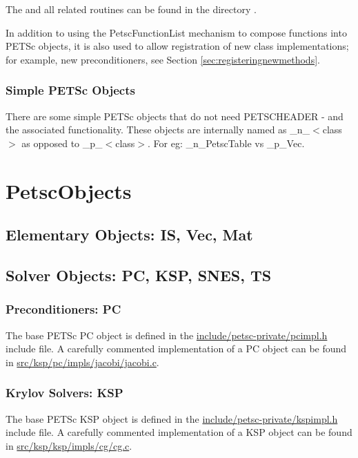 \documentclass[twoside,12pt]{../sty/report_petsc}
\begin{document}
The  and all related routines can be found in the directory
.

In addition to using the PetscFunctionList mechanism to compose functions into PETSc objects, it is
also used to allow registration of new class implementations; for example, new
preconditioners, see Section \ref{sec:registeringnewmethods}.

\subsection{Simple PETSc Objects}

There are some simple PETSc objects that do not need PETSCHEADER - and
the associated functionality. These objects are internally named as
\_n\_$<$class$>$ as opposed to \_p\_$<$class$>$. For eg: \_n\_PetscTable
vs \_p\_Vec.

\chapter{PetscObjects}

\section{Elementary Objects: IS, Vec, Mat}

\section{Solver Objects: PC, KSP, SNES, TS}

\subsection{Preconditioners: PC}

The base PETSc PC object is defined in the  \href{http://www.mcs.anl.gov/petsc/petsc-dev/include/petsc-private/pcimpl.h.html}{include/petsc-private/pcimpl.h} include file.
A carefully commented implementation of a PC object can be found in
\href{http://www.mcs.anl.gov/petsc/petsc-dev/src/ksp/pc/impls/jacobi/jacobi.c.html}{src/ksp/pc/impls/jacobi/jacobi.c}.


\subsection{Krylov Solvers: KSP}
The base PETSc KSP object is defined in the \href{http://www.mcs.anl.gov/petsc/petsc-dev/include/petsc-private/kspimpl.h.html}{include/petsc-private/kspimpl.h} include file.
A carefully commented implementation of a KSP object can be found in
\href{http://www.mcs.anl.gov/petsc/petsc-dev/src/ksp/ksp/impls/cg/cg.c.html}{src/ksp/ksp/impls/cg/cg.c}.
\end{document}
